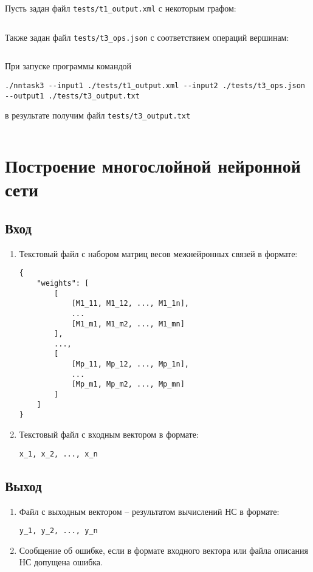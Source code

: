 \documentclass[spec, och, labwork]{SCWorks}
\begin{document}
Пусть задан файл \verb|tests/t1_output.xml| с некоторым графом:
\inputminted{xml}{../tests/t1_output.xml}

Также задан файл \verb|tests/t3_ops.json| с соответствием операций вершинам:
\inputminted{json}{../tests/t3_ops.json}

При запуске программы командой
\begin{verbatim}
./nntask3 --input1 ./tests/t1_output.xml --input2 ./tests/t3_ops.json --output1 ./tests/t3_output.txt
\end{verbatim}
в результате получим файл \verb|tests/t3_output.txt|
\inputminted{xml}{../tests/t3_output.txt}


\section{Построение многослойной нейронной сети}

\subsection*{Вход}

\begin{enumerate}
  \item
    Текстовый файл с набором матриц весов межнейронных связей в формате:
    \begin{verbatim}
{
    "weights": [
        [
            [M1_11, M1_12, ..., M1_1n],
            ...
            [M1_m1, M1_m2, ..., M1_mn]
        ],
        ...,
        [
            [Mp_11, Mp_12, ..., Mp_1n],
            ...
            [Mp_m1, Mp_m2, ..., Mp_mn]
        ]
    ]
}
    \end{verbatim}
  \item
    Текстовый файл с входным вектором в формате:
    \begin{verbatim}
x_1, x_2, ..., x_n
    \end{verbatim}
\end{enumerate}

\subsection*{Выход}

\begin{enumerate}
  \item
    Файл с выходным вектором – результатом вычислений НС в формате:
    \begin{verbatim}
y_1, y_2, ..., y_n
    \end{verbatim}
  \item
    Сообщение об ошибке, если в формате входного вектора или файла описания НС
    допущена ошибка.
\end{enumerate}
\end{document}
